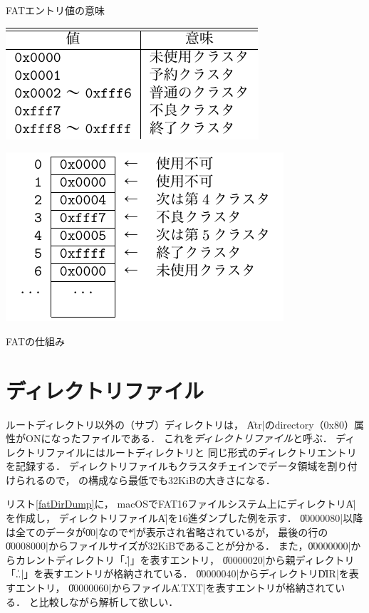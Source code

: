 \begin{table}[btp]
  \centering
  \begin{minipage}{0.5\textwidth}
    \caption{FATエントリ値の意味}
    \label{tab:fatClsNum}
    \centerline{\includegraphics[scale=1.0]{Tbl/fatClsNum.pdf}}
  \end{minipage}
  \begin{minipage}[c]{0.4\textwidth}
    \makeatletter
    \def\@captype{figure}
    \makeatother
    \centerline{\includegraphics[scale=1.0]{Fig/fatConcept.pdf}}
    \caption{FATの仕組み}
    \label{fig:fatConcept}
  \end{minipage}
\end{table}

\section{ディレクトリファイル}
ルートディレクトリ以外の（サブ）ディレクトリは，
\|Atr|のdirectory（0x80）属性がONになったファイルである．
これを\emph{ディレクトリファイル}と呼ぶ．
ディレクトリファイルにはルートディレクトリと
同じ形式のディレクトリエントリを記録する．
ディレクトリファイルもクラスタチェインでデータ領域を割り付けられるので，
の構成なら最低でも32KiBの大きさになる．

リスト\ref{fatDirDump}に，
macOSでFAT16ファイルシステム上にディレクトリ\|A|を作成し，
ディレクトリファイル\|A|を16進ダンプした例を示す．
\|00000080|以降は全てのデータが\|00|なので\|*|が表示され省略されているが，
最後の行の\|00008000|からファイルサイズが32KiBであることが分かる．
また，\|00000000|からカレントディレクトリ「\|.|」を表すエントリ，
\|00000020|から親ディレクトリ「\|..|」を表すエントリが格納されている．
\|00000040|からディレクトリ\|DIR|を表すエントリ，
\|00000060|からファイル\|A.TXT|を表すエントリが格納されている．
と比較しながら解析して欲しい．

